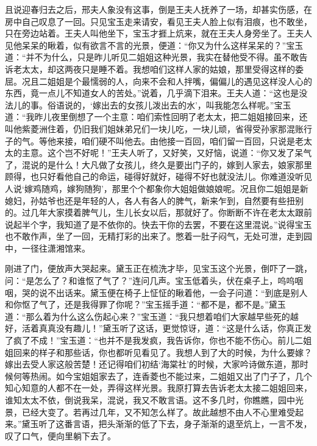 


\begin{parag}
    且说迎春归去之后，邢夫人象没有这事，倒是王夫人抚养了一场，却甚实伤感，在房中自己叹息了一回。只见宝玉走来请安，看见王夫人脸上似有泪痕，也不敢坐，只在旁边站着。王夫人叫他坐下，宝玉才捱上炕来，就在王夫人身旁坐了。王夫人见他呆呆的瞅着，似有欲言不言的光景，便道：“你又为什么这样呆呆的？”宝玉道：“并不为什么，只是昨儿听见二姐姐这种光景，我实在替他受不得。虽不敢告诉老太太，却这两夜只是睡不着。我想咱们这样人家的姑娘，那里受得这样的委屈。况且二姐姐是个最懦弱的人，向来不会和人拌嘴，偏偏儿的遇见这样没人心的东西，竟一点儿不知道女人的苦处。”说着，几乎滴下泪来。王夫人道：“这也是没法儿的事。俗语说的，‘嫁出去的女孩儿泼出去的水’，叫我能怎么样呢。”宝玉道：“我昨儿夜里倒想了一个主意：咱们索性回明了老太太，把二姐姐接回来，还叫他紫菱洲住着，仍旧我们姐妹弟兄们一块儿吃，一块儿顽，省得受孙家那混账行子的气。等他来接，咱们硬不叫他去。由他接一百回，咱们留一百回，只说是老太太的主意。这个岂不好呢！”王夫人听了，又好笑，又好恼，说道：“你又发了呆气了，混说的是什么！大凡做了女孩儿，终久是要出门子的，嫁到人家去，娘家那里顾得，也只好看他自己的命运，碰得好就好，碰得不好也就没法儿。你难道没听见人说‘嫁鸡随鸡，嫁狗随狗’，那里个个都象你大姐姐做娘娘呢。况且你二姐姐是新媳妇，孙姑爷也还是年轻的人，各人有各人的脾气，新来乍到，自然要有些扭别的。过几年大家摸着脾气儿，生儿长女以后，那就好了。你断断不许在老太太跟前说起半个字，我知道了是不依你的。快去干你的去罢，不要在这里混说。”说得宝玉也不敢作声，坐了一回，无精打彩的出来了。憋着一肚子闷气，无处可泄，走到园中，一径往潇湘馆来。
\end{parag}


\begin{parag}
    刚进了门，便放声大哭起来。黛玉正在梳洗才毕，见宝玉这个光景，倒吓了一跳，问：“是怎么了？和谁怄了气了？”连问几声。宝玉低着头，伏在桌子上，呜呜咽咽，哭的说不出话来。黛玉便在椅子上怔怔的瞅着他，一会子问道：“到底是别人和你怄了气了，还是我得罪了你呢？”宝玉摇手道：“都不是，都不是。”黛玉道：“那么着为什么这么伤起心来？”宝玉道：“我只想着咱们大家越早些死的越好，活着真真没有趣儿！”黛玉听了这话，更觉惊讶，道：“这是什么话，你真正发了疯了不成！”宝玉道：“也并不是我发疯，我告诉你，你也不能不伤心。前儿二姐姐回来的样子和那些话，你也都听见看见了。我想人到了大的时候，为什么要嫁？嫁出去受人家这般苦楚！还记得咱们初结‘海棠社’的时候，大家吟诗做东道，那时候何等热闹。如今宝姐姐家去了，连香菱也不能过来，二姐姐又出了门子了，几个知心知意的人都不在一处，弄得这样光景。我原打算去告诉老太太接二姐姐回来，谁知太太不依，倒说我呆，混说，我又不敢言语。这不多几时，你瞧瞧，园中光景，已经大变了。若再过几年，又不知怎么样了。故此越想不由人不心里难受起来。”黛玉听了这番言语，把头渐渐的低了下去，身子渐渐的退至炕上，一言不发，叹了口气，便向里躺下去了。
\end{parag}


